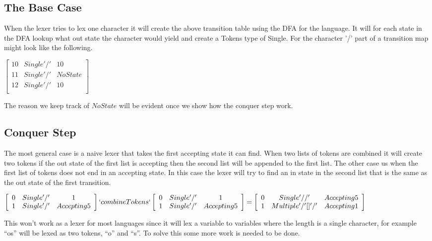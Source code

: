\subsection{The Base Case}
When the lexer tries to lex one character it will create the above transition
table using the DFA for the language. It will for each state in the DFA lookup
what out state the character would yield and create a Tokens type of Single.
For the character '/' part of a transition map might look like the following.
\begin{center}
$\left[\begin{array}{ccc}
10&Single '/'&10\\
11&Single '/'&NoState\\
12&Single '/'&10\\
\end{array}\right]$
\end{center}
The reason we keep track of $NoState$ will be evident once we show how the
conquer step work.

\subsection{Conquer Step}
The most general case is a naive lexer that takes the first accepting state it
can find. When two lists of tokens are combined it will create two tokens if the
out state of the first list is accepting then the second list will be appended
to the first list. The other case us when the first list of tokens does not end
in an accepting state. In this case the lexer will try to find an in state in
the second list that is the same as the out state of the first transition.
\begin{center}
$\left[\begin{array}{ccc}
0&Single '/'&1\\
1&Single '/'&Accepting 5\\
\end{array}\right] `combineTokens`
\left[\begin{array}{ccc}
0&Single '/'&1\\
1&Single '/'&Accepting 5\\
\end{array}\right] =
\left[\begin{array}{ccc}
0&Single '//'&Accepting 5\\
1&Multiple '/' [] '/'&Accepting 1\\
\end{array}\right]$
\end{center}
This won't work as a lexer for most languages since it will lex a variable to
variables where the length is a single character, for example ``os'' will be
lexed as two tokens, ``o'' and ``s''. To solve this some more work is needed to
be done.

